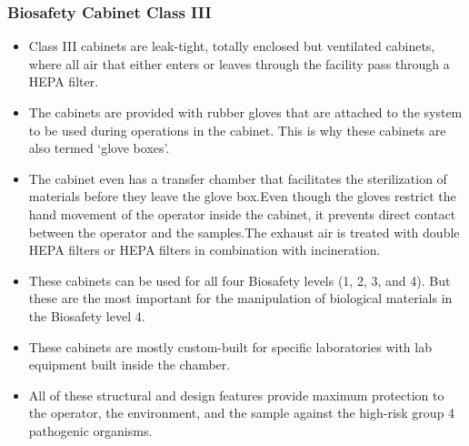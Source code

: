 \documentclass{article}
\begin{document}
\subsubsection{Biosafety Cabinet Class III}
\begin{itemize}
\item Class III cabinets are leak-tight, totally enclosed but ventilated cabinets, where all air that either enters or leaves through the facility pass through a HEPA filter.
\item The cabinets are provided with rubber gloves that are attached to the system to be used during operations in the cabinet. This is why these cabinets are also termed ‘glove boxes’.
\item The cabinet even has a transfer chamber that facilitates the sterilization of materials before they leave the glove box.Even though the gloves restrict the hand movement of the operator inside the cabinet, it prevents direct contact between the operator and the samples.The exhaust air is treated with double HEPA filters or HEPA filters in combination with incineration.
\item These cabinets can be used for all four Biosafety levels (1, 2, 3, and 4). But these are the most important for the manipulation of biological materials in the Biosafety level 4.
\item These cabinets are mostly custom-built for specific laboratories with lab equipment built inside the chamber.
\item All of these structural and design features provide maximum protection to the operator, the environment, and the sample against the high-risk group 4 pathogenic organisms.
\end{itemize}
\end{document}

